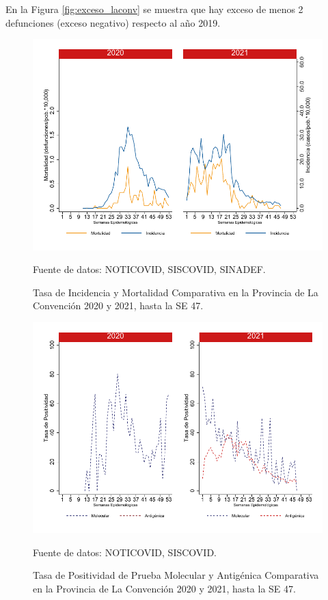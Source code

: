 \documentclass[12pt,a4paper,openany]{book}
\begin{document}
	En la Figura \ref{fig:exceso_laconv} se muestra que hay exceso de menos 2 defunciones (exceso negativo) respecto al año 2019.
		
		\begin{figure}[h]
			\caption{Tasa de Incidencia y Mortalidad Comparativa en la Provincia de La Convención 2020 y 2021, hasta la SE 47.}\label{fig:inc_mort_laconv}
			\begin{center}
				\includegraphics[width=0.7\linewidth]{../figuras/incidencia_mortalidad_20_21_9}
			\end{center}
			{\footnotesize {Fuente de datos: NOTICOVID, SISCOVID, SINADEF.}}
		\end{figure}
		
		\begin{figure}[h]
			\caption{Tasa de Positividad de Prueba Molecular y Antigénica Comparativa en la Provincia de La Convención 2020 y 2021, hasta la SE 47.}\label{fig:positividad_laconv}
			\begin{center}
				\includegraphics[width=0.7\linewidth]{../figuras/positividad_20_21_9}
			\end{center}
			{\footnotesize {Fuente de datos: NOTICOVID, SISCOVID.}}
		\end{figure}
		
\end{document}
